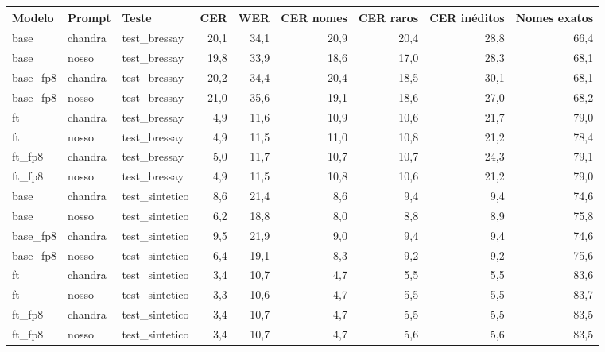 \begin{tabular}{@{}lllrrrrrr@{}}
\toprule
Modelo & Prompt & Teste & CER & WER & CER nomes & CER raros & CER inéditos & Nomes exatos \\
\midrule
base & chandra & test\_bressay & 20,1 & 34,1 & 20,9 & 20,4 & 28,8 & 66,4 \\
base & nosso & test\_bressay & 19,8 & 33,9 & 18,6 & 17,0 & 28,3 & 68,1 \\
base\_fp8 & chandra & test\_bressay & 20,2 & 34,4 & 20,4 & 18,5 & 30,1 & 68,1 \\
base\_fp8 & nosso & test\_bressay & 21,0 & 35,6 & 19,1 & 18,6 & 27,0 & 68,2 \\
ft & chandra & test\_bressay & 4,9 & 11,6 & 10,9 & 10,6 & 21,7 & 79,0 \\
ft & nosso & test\_bressay & 4,9 & 11,5 & 11,0 & 10,8 & 21,2 & 78,4 \\
ft\_fp8 & chandra & test\_bressay & 5,0 & 11,7 & 10,7 & 10,7 & 24,3 & 79,1 \\
ft\_fp8 & nosso & test\_bressay & 4,9 & 11,5 & 10,8 & 10,6 & 21,2 & 79,0 \\
base & chandra & test\_sintetico & 8,6 & 21,4 & 8,6 & 9,4 & 9,4 & 74,6 \\
base & nosso & test\_sintetico & 6,2 & 18,8 & 8,0 & 8,8 & 8,9 & 75,8 \\
base\_fp8 & chandra & test\_sintetico & 9,5 & 21,9 & 9,0 & 9,4 & 9,4 & 74,6 \\
base\_fp8 & nosso & test\_sintetico & 6,4 & 19,1 & 8,3 & 9,2 & 9,2 & 75,6 \\
ft & chandra & test\_sintetico & 3,4 & 10,7 & 4,7 & 5,5 & 5,5 & 83,6 \\
ft & nosso & test\_sintetico & 3,3 & 10,6 & 4,7 & 5,5 & 5,5 & 83,7 \\
ft\_fp8 & chandra & test\_sintetico & 3,4 & 10,7 & 4,7 & 5,5 & 5,5 & 83,5 \\
ft\_fp8 & nosso & test\_sintetico & 3,4 & 10,7 & 4,7 & 5,6 & 5,6 & 83,5 \\
\bottomrule
\end{tabular}
